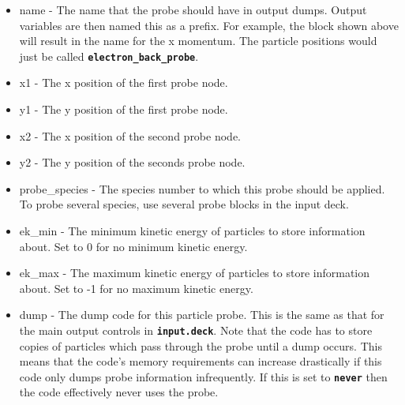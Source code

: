 \documentclass[12pt,a4paper]{article}
\newcommand{\inlinecode}[1]{{\color{warwickred} \bf\texttt{#1}}}
\begin{document}
\begin{itemize}
\item name - The name that the probe should have in output dumps. Output
  variables are then named this as a prefix. For example, the block shown
  above will result in the name\linebreak \inlinecode{electron\_back\_probe\_px} for
  the x momentum. The particle positions would just be called\linebreak
  \inlinecode{electron\_back\_probe}.
\item x1 - The x position of the first probe node.
\item y1 - The y position of the first probe node.
\item x2 - The x position of the second probe node.
\item y2 - The y position of the seconds probe node.
\item probe\_species - The species number to which this probe should be
  applied. To probe several species, use several probe blocks in the input
  deck.
\item ek\_min - The minimum kinetic energy of particles to store information
  about. Set to 0 for no minimum kinetic energy.
\item ek\_max - The maximum kinetic energy of particles to store information
  about. Set to -1 for no maximum kinetic energy.
\item dump - The dump code for this particle probe. This is the same as that
  for the main output controls in \inlinecode{input.deck}. Note that the code
  has to store copies of particles which pass through the probe until a dump
  occurs. This means that the code's memory requirements can increase
  drastically if this code only dumps probe information infrequently. If this
  is set to \inlinecode{never} then the code effectively never uses the probe.
\end{itemize}
\end{document}
